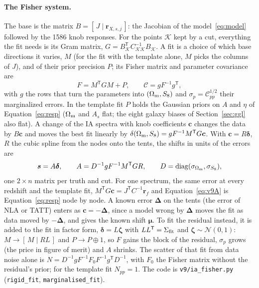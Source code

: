 \documentclass[11pt]{article}
\newcommand{\Om}{\Omega_{\rm m}}
\newcommand{\T}{^{\mathsf{T}}}
\newcommand{\bvec}[1]{\boldsymbol{#1}}
\begin{document}
\paragraph{The Fisher system.}
The base is the matrix $B = [\,J \mid \bvec r_{X,s,j}\,]$: the Jacobian of
the model~\eqref{eq:model} followed by the 1586 knob responses. For the
points $\mathcal K$ kept by a cut, everything the fit needs is its Gram
matrix, $G = B_{\mathcal K}\T C_{\mathcal K\mathcal K}^{-1} B_{\mathcal K}$.
A fit is a choice of which base directions it varies, $M$ (for the fit with
the template alone, $M$ picks the columns of $J$), and of their prior
precision $P$; its Fisher matrix and parameter covariance are
\begin{equation}
  F = M\T G M + P,\qquad
  \mathcal C = g F^{-1} g\T,
  \label{eq:v9fisher}
\end{equation}
with $g$ the rows that turn the parameters into $(\Om, S_8)$ and $\sigma_p
= \mathcal C_{pp}^{1/2}$ their marginalized errors. In the template fit $P$
holds the Gaussian priors on $A$ and $\eta$ of Equation~\eqref{eq:resp}
($\Om$ and $A_s$ flat; the eight galaxy biases of Section~\ref{sec:ggl}
also flat). A change of the IA spectra with knob coefficients $\bvec c$
changes the data by $B\bvec c$ and moves the best fit linearly by
$\delta(\Om, S_8) = g F^{-1} M\T G \bvec c$. With $\bvec c = R\bvec\delta$,
$R$ the cubic spline from the nodes onto the tents, the shifts in units of
the errors are
\begin{equation}
  \bvec s = A\bvec\delta,\qquad
  A = D^{-1} g F^{-1} M\T G R,\qquad D = {\rm diag}(\sigma_{\Om}, \sigma_{S_8}),
  \label{eq:v9A}
\end{equation}
one $2 \times n$ matrix per truth and cut. For one spectrum, the same error
at every redshift and the template fit, $M\T G\bvec c = J\T C^{-1}\bvec r_f$
and Equation~\eqref{eq:v9A} is Equation~\eqref{eq:resp} node by node. A
known error $\bvec\Delta$ on the tents (the error of NLA or TATT) enters as
$\bvec c = -\bvec\Delta$, since a model wrong by $\bvec\Delta$ moves the fit
as data moved by $-\bvec\Delta$, and gives the known shift $\bvec\mu$. To
fit the residual instead, it is added to the fit in factor form, $\bvec\delta
= L\bvec\zeta$ with $LL\T = \Sigma_{\rm fit}$ and $\bvec\zeta \sim
\mathcal N(0, 1)$: $M \to [\,M \mid RL\,]$ and $P \to P \oplus 1$, so
$F$ gains the block of the residual, $\sigma_p$ grows (the price in figure
of merit) and $A$ shrinks. The scatter of that fit from data noise alone is
$N = D^{-1} g F^{-1} F_0 F^{-1} g\T D^{-1}$, with $F_0$ the Fisher matrix
without the residual's prior; for the template fit $N_{pp} = 1$. The code
is \texttt{v9/ia\_fisher.py} (\texttt{rigid\_fit},
\texttt{marginalised\_fit}).
\end{document}
